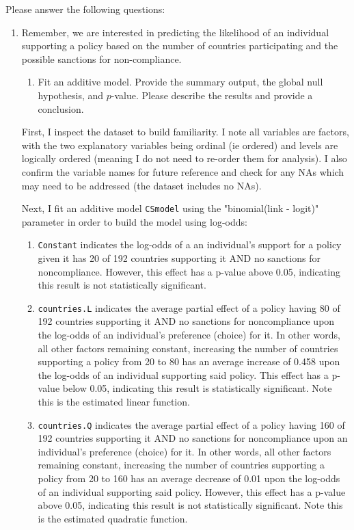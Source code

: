 \documentclass[12pt,letterpaper]{article}
\begin{document}
\newpage
\noindent Please answer the following questions:

\begin{enumerate}
	\item
	Remember, we are interested in predicting the likelihood of an individual supporting a policy based on the number of countries participating and the possible sanctions for non-compliance.
	\begin{enumerate}
		\item [] Fit an additive model. Provide the summary output, the global null hypothesis, and $p$-value. Please describe the results and provide a conclusion.
	\end{enumerate}
	
	\noindent First, I inspect the dataset to build familiarity. I note all variables are factors, with the two explanatory variables being ordinal (ie ordered) and levels are logically ordered (meaning I do not need to re-order them for analysis). I also confirm the variable names for future reference and check for any NAs which may need to be addressed (the dataset includes no NAs).
	
	
	
	\noindent Next, I fit an additive model \texttt{CSmodel} using the "binomial(link - logit)" parameter in order to build the model using log-odds:
	
	\begin{enumerate}
		\item \texttt{Constant} indicates the log-odds of a an individual's support for a policy given it has 20 of 192 countries supporting it AND no sanctions for noncompliance. However, this effect has a p-value above 0.05, indicating this result is not statistically significant.
		
		\item \texttt{countries.L} indicates the average partial effect of a policy having 80 of 192 countries supporting it AND no sanctions for noncompliance upon the log-odds of an individual's preference (choice) for it. In other words, all other factors remaining constant, increasing the number of countries supporting a policy from 20 to 80 has an average increase of 0.458 upon the log-odds of an individual supporting said policy. This effect has a p-value below 0.05, indicating this result is statistically significant. Note this is the estimated linear function.
		
		\item \texttt{countries.Q} indicates the average partial effect of a policy having 160 of 192 countries supporting it AND no sanctions for noncompliance upon an individual's preference (choice) for it. In other words, all other factors remaining constant, increasing the number of countries supporting a policy from 20 to 160 has an average decrease of 0.01 upon the log-odds of an individual supporting said policy. However, this effect has a p-value above 0.05, indicating this result is not statistically significant. Note this is the estimated quadratic function.
		

\end{enumerate}
\end{enumerate}
\end{document}
